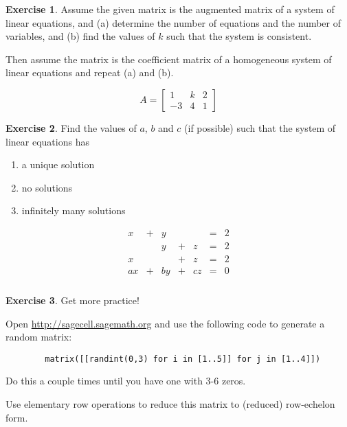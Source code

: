 \documentclass{beamer}
\theoremstyle{definition}
\newtheorem{exercise}{Exercise}
\begin{document}
\begin{frame}{\insertframenumber}
	\begin{exercise}
		Assume the given matrix is the augmented matrix of a system of linear equations, and (a) determine the number of equations and the number of variables, and (b) find the values of $k$ such that the system is consistent.  
	
		Then assume the matrix is the coefficient matrix of a homogeneous system of linear equations and repeat (a) and (b).
		
		\[A=\begin{bmatrix} 1&k&2\\-3&4&1\end{bmatrix}\]
	\end{exercise}
\end{frame}

\begin{frame}{\insertframenumber}
	\begin{exercise}
		Find the values of $a$, $b$ and $c$ (if possible) such that the system of linear equations has 	
		\begin{enumerate}[label=(\alph*)]
			\item a unique solution
			\item no solutions
			\item infinitely many solutions
		\end{enumerate}
		\[\begin{matrix}
			x&+&y&&&=&2\\
			&&y&+&z&=&2\\
			x&&&+&z&=&2\\
			ax&+&by&+&cz&=&0
		\end{matrix}\]
	\end{exercise}
\end{frame}

\begin{frame}[fragile]
	\frametitle{\insertframenumber}
	\begin{exercise}
		Get more practice!
		
		Open \url{http://sagecell.sagemath.org} and use the following code to generate a random matrix:
		
		
		\begin{verbatim}
		matrix([[randint(0,3) for i in [1..5]] for j in [1..4]])
		\end{verbatim}
		
		Do this a couple times until you have one with 3-6 zeros.
		
		Use elementary row operations to reduce this matrix to (reduced) row-echelon form.
	\end{exercise}
\end{frame}
\end{document}
